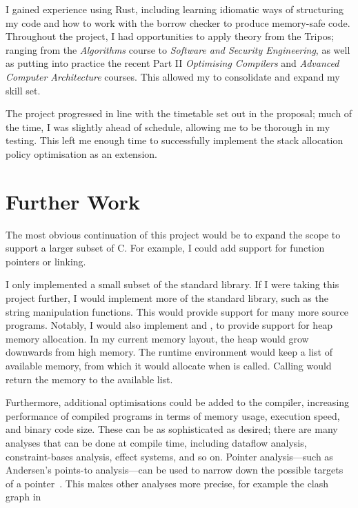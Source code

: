 \documentclass[00-main.tex]{subfiles}
\begin{document}
I gained experience using Rust, including learning idiomatic ways of structuring my code and how to work with the borrow checker to produce memory-safe code.
Throughout the project, I had opportunities to apply theory from the Tripos; ranging from the \emph{Algorithms} course to \emph{Software and Security Engineering}, as well as putting into practice the recent Part II \emph{Optimising Compilers} and \emph{Advanced Computer Architecture} courses.
This allowed my to consolidate and expand my skill set.

The project progressed in line with the timetable set out in the proposal; much of the time, I was slightly ahead of schedule, allowing me to be thorough in my testing.
This left me enough time to successfully implement the stack allocation policy optimisation as an extension.

\section{Further Work}

The most obvious continuation of this project would be to expand the scope to support a larger subset of C.
For example, I could add support for function pointers or linking.

I only implemented a small subset of the standard library.
If I were taking this project further, I would implement more of the standard library, such as the string manipulation functions.
This would provide support for many more source programs.
Notably, I would also implement  and , to provide support for heap memory allocation.
In my current memory layout, the heap would grow downwards from high memory.
The runtime environment would keep a list of available memory, from which it would allocate when  is called.
Calling  would return the memory to the available list.

Furthermore, additional optimisations could be added to the compiler, increasing performance of compiled programs in terms of memory usage, execution speed, and binary code size.
These can be as sophisticated as desired; there are many analyses that can be done at compile time, including dataflow analysis, constraint-bases analysis, effect systems, and so on.
Pointer analysis---such as Andersen's points-to analysis---can be used to narrow down the possible targets of a pointer~.
This makes other analyses more precise, for example the clash graph in~
\end{document}
